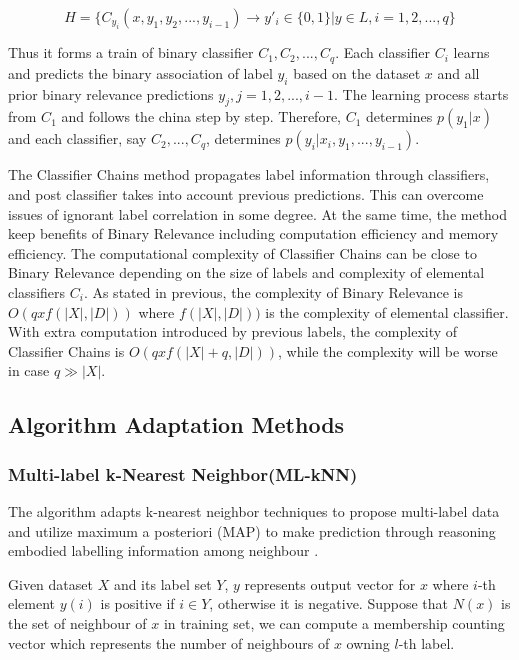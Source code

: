 \begin{equation}\label{eq:ClassifierChains}
H = \{C_{y_{i}}(x, y_{1},y_{2},...,y_{i-1}) \to y'_{i} \in \{0,1\}| y \in L, i = 1,2,...,q\}
\end{equation}

Thus it forms a train of binary classifier $C_{1},C_{2},...,C_{q}$. Each classifier $C_{i}$ learns and predicts the binary association of label $y_{i}$ based on the dataset $x$ and all prior binary relevance predictions $y_{j}, j = 1,2,...,i-1$. The learning process starts from $C_{1}$ and follows the china step by step. Therefore, $C_{1}$ determines $p(y_{1}|x)$ and each classifier, say $C_{2},...,C_{q}$, determines $p(y_{i}|x_{i},y_{1},...,y_{i-1})$.

The Classifier Chains method propagates label information through classifiers, and post classifier takes into account previous predictions. This can overcome issues of ignorant label correlation in some degree. At the same time, the method keep benefits of Binary Relevance including computation efficiency and memory efficiency. The computational complexity of Classifier Chains can be close to Binary Relevance depending on the size of labels and complexity of elemental classifiers $C_{i}$. As stated in previous, the complexity of Binary Relevance is $O(qxf(|X|,|D|))$ where $f(|X|,|D|))$ is the complexity of elemental classifier. With extra computation introduced by previous labels, the complexity of Classifier Chains is $O(qxf(|X|+q,|D|))$, while the complexity will be worse in case $q \gg |X|$.

\subsection{Algorithm Adaptation Methods}

\subsubsection{Multi-label k-Nearest Neighbor(ML-kNN)}

The algorithm adapts k-nearest neighbor techniques to propose multi-label data and utilize maximum a posteriori (MAP) to make prediction through reasoning embodied labelling information among neighbour \citep{zhang2007ml}.

Given dataset $X$ and its label set $Y$, $y$ represents output vector for $x$ where $i$-th element $y(i)$ is positive if $i \in Y$, otherwise it is negative. Suppose that $N(x)$ is the set of neighbour of $x$ in training set, we can compute a membership counting vector which represents the number of neighbours of $x$ owning $l$-th label.


